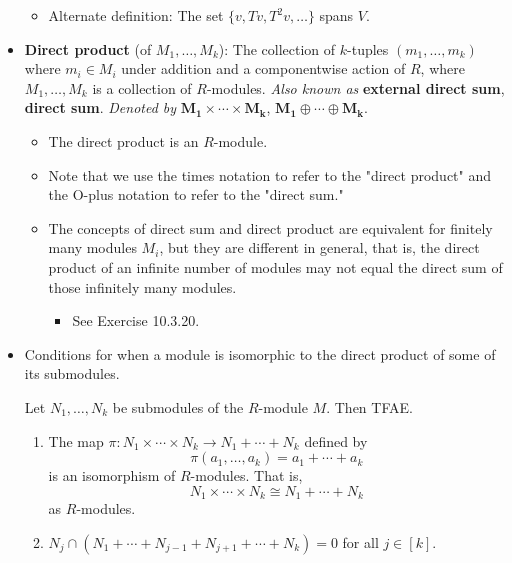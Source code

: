 \documentclass[../notes.tex]{subfiles}
\begin{document}
\begin{itemize}
    \begin{itemize}
        \item Alternate definition: The set $\{v,Tv,T^2v,\dots\}$ spans $V$.
    \end{itemize}
    \item {}\textbf{Direct product} (of $M_1,\dots,M_k$): The collection of $k$-tuples $(m_1,\dots,m_k)$ where $m_i\in M_i$ under addition and a componentwise action of $R$, where $M_1,\dots,M_k$ is a collection of $R$-modules. \emph{Also known as} \textbf{external direct sum}, \textbf{direct sum}. \emph{Denoted by} $\bm{M_1\times\cdots\times M_k}$, $\bm{M_1\oplus\cdots\oplus M_k}$.
    \begin{itemize}
        \item The direct product is an $R$-module.
        \item Note that we use the times notation to refer to the "direct product" and the O-plus notation to refer to the "direct sum."
        \item The concepts of direct sum and direct product are equivalent for finitely many modules $M_i$, but they are different in general, that is, the direct product of an infinite number of modules may not equal the direct sum of those infinitely many modules.
        \begin{itemize}
            \item See Exercise 10.3.20.
        \end{itemize}
    \end{itemize}
    \item Conditions for when a module is isomorphic to the direct product of some of its submodules.
    \begin{proposition}\label{prp:10.5}
        Let $N_1,\dots,N_k$ be submodules of the $R$-module $M$. Then TFAE.
        \begin{enumerate}
            \item The map $\pi:N_1\times\cdots\times N_k\to N_1+\cdots+N_k$ defined by
            \begin{equation*}
                \pi(a_1,\dots,a_k) = a_1+\cdots+a_k
            \end{equation*}
            is an isomorphism of $R$-modules. That is,
            \begin{equation*}
                N_1\times\cdots\times N_k \cong N_1+\cdots+N_k
            \end{equation*}
            as $R$-modules.
            \item $N_j\cap(N_1+\cdots+N_{j-1}+N_{j+1}+\cdots+N_k)=0$ for all $j\in[k]$.

\end{enumerate}
\end{proposition}
\end{itemize}
\end{document}

